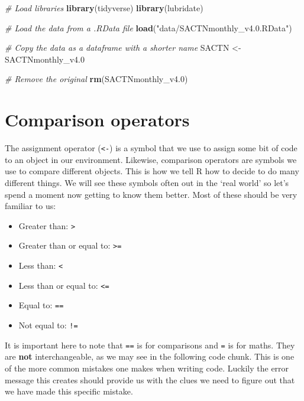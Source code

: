 \documentclass[
]{book}
\newenvironment{Shaded}{\begin{snugshade}}{\end{snugshade}}
\newcommand{\CommentTok}[1]{\textcolor[rgb]{0.56,0.35,0.01}{\textit{#1}}}
\newcommand{\FloatTok}[1]{\textcolor[rgb]{0.00,0.00,0.81}{#1}}
\newcommand{\KeywordTok}[1]{\textcolor[rgb]{0.13,0.29,0.53}{\textbf{#1}}}
\newcommand{\NormalTok}[1]{#1}
\newcommand{\StringTok}[1]{\textcolor[rgb]{0.31,0.60,0.02}{#1}}
\providecommand{\tightlist}{%
  \setlength{\itemsep}{0pt}\setlength{\parskip}{0pt}}
\begin{document}
\begin{Shaded}
\begin{Highlighting}[]
\CommentTok{\# Load libraries}
\KeywordTok{library}\NormalTok{(tidyverse)}
\KeywordTok{library}\NormalTok{(lubridate)}

\CommentTok{\# Load the data from a .RData file}
\KeywordTok{load}\NormalTok{(}\StringTok{"data/SACTNmonthly\_v4.0.RData"}\NormalTok{)}

\CommentTok{\# Copy the data as a dataframe with a shorter name}
\NormalTok{SACTN <{-}}\StringTok{ }\NormalTok{SACTNmonthly\_v4}\FloatTok{.0}

\CommentTok{\# Remove the original}
\KeywordTok{rm}\NormalTok{(SACTNmonthly\_v4}\FloatTok{.0}\NormalTok{)}
\end{Highlighting}
\end{Shaded}

\hypertarget{comparison-operators}{%
\section{Comparison operators}\label{comparison-operators}}

The assignment operator (\texttt{\textless{}-}) is a symbol that we use to assign some bit of code to an object in our environment. Likewise, comparison operators are symbols we use to compare different objects. This is how we tell R how to decide to do many different things. We will see these symbols often out in the `real world' so let's spend a moment now getting to know them better. Most of these should be very familiar to us:

\begin{itemize}
\tightlist
\item
  Greater than: \texttt{\textgreater{}}\\
\item
  Greater than or equal to: \texttt{\textgreater{}=}\\
\item
  Less than: \texttt{\textless{}}\\
\item
  Less than or equal to: \texttt{\textless{}=}\\
\item
  Equal to: \texttt{==}\\
\item
  Not equal to: \texttt{!=}
\end{itemize}

It is important here to note that \texttt{==} is for comparisons and \texttt{=} is for maths. They are \textbf{not} interchangeable, as we may see in the following code chunk. This is one of the more common mistakes one makes when writing code. Luckily the error message this creates should provide us with the clues we need to figure out that we have made this specific mistake.
\end{document}
